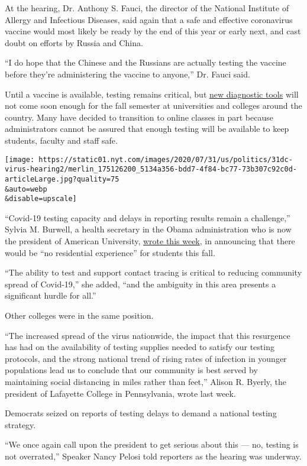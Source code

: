 At the hearing, Dr. Anthony S. Fauci, the director of the National
Institute of Allergy and Infectious Diseases, said again that a safe and
effective coronavirus vaccine would most likely be ready by the end of
this year or early next, and cast doubt on efforts by Russia and China.

``I do hope that the Chinese and the Russians are actually testing the
vaccine before they're administering the vaccine to anyone,'' Dr. Fauci
said.

Until a vaccine is available, testing remains critical, but
\href{https://www.nytimes.com/2020/07/06/health/fast-coronavirus-tests.html}{new
diagnostic tools} will not come soon enough for the fall semester at
universities and colleges around the country. Many have decided to
transition to online classes in part because administrators cannot be
assured that enough testing will be available to keep students, faculty
and staff safe.

\texttt{[image: https://static01.nyt.com/images/2020/07/31/us/politics/31dc-virus-hearing2/merlin\_175126200\_5134a356-bdd7-4f84-bc77-73b307c92c0d-articleLarge.jpg?quality=75\\\&auto=webp\\\&disable=upscale]}

``Covid-19 testing capacity and delays in reporting results remain a
challenge,'' Sylvia M. Burwell, a health secretary in the Obama
administration who is now the president of American University,
\href{https://www.american.edu/president/announcements/july-30-2020.cfm}{wrote
this week}, in announcing that there would be ``no residential
experience'' for students this fall.

``The ability to test and support contact tracing is critical to
reducing community spread of Covid-19,'' she added, ``and the ambiguity
in this area presents a significant hurdle for all.''

Other colleges were in the same position.

``The increased spread of the virus nationwide, the impact that this
resurgence has had on the availability of testing supplies needed to
satisfy our testing protocols, and the strong national trend of rising
rates of infection in younger populations lead us to conclude that our
community is best served by maintaining social distancing in miles
rather than feet,'' Alison R. Byerly, the president of Lafayette College
in Pennsylvania, wrote last week.

Democrats seized on reports of testing delays to demand a national
testing strategy.

``We once again call upon the president to get serious about this ---
no, testing is not overrated,'' Speaker Nancy Pelosi told reporters as
the hearing was underway.

